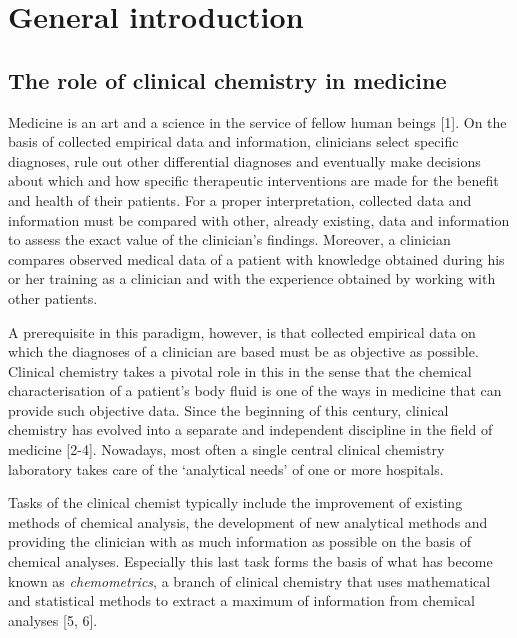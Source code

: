\documentclass[
  12pt,
  a4paperpaper,
]{report}
\author{}
\date{}
\begin{document}
\hypertarget{general-introduction}{%
\chapter{General introduction}\label{general-introduction}}

\hypertarget{the-role-of-clinical-chemistry-in-medicine}{%
\section{The role of clinical chemistry in
medicine}\label{the-role-of-clinical-chemistry-in-medicine}}

Medicine is an art and a science in the service of fellow human beings
{[}1{]}. On the basis of collected empirical data and information,
clinicians select specific diagnoses, rule out other differential
diagnoses and eventually make decisions about which and how specific
therapeutic interventions are made for the benefit and health of their
patients. For a proper interpretation, collected data and information
must be compared with other, already existing, data and information to
assess the exact value of the clinician's findings. Moreover, a
clinician compares observed medical data of a patient with knowledge
obtained during his or her training as a clinician and with the
experience obtained by working with other patients.

A prerequisite in this paradigm, however, is that collected empirical
data on which the diagnoses of a clinician are based must be as
objective as possible. Clinical chemistry takes a pivotal role in this
in the sense that the chemical characterisation of a patient's body
fluid is one of the ways in medicine that can provide such objective
data. Since the beginning of this century, clinical chemistry has
evolved into a separate and independent discipline in the field of
medicine {[}2-4{]}. Nowadays, most often a single central clinical
chemistry laboratory takes care of the `analytical needs' of one or more
hospitals.

Tasks of the clinical chemist typically include the improvement of
existing methods of chemical analysis, the development of new analytical
methods and providing the clinician with as much information as possible
on the basis of chemical analyses. Especially this last task forms the
basis of what has become known as \emph{chemometrics}, a branch of
clinical chemistry that uses mathematical and statistical methods to
extract a maximum of information from chemical analyses {[}5, 6{]}.
\end{document}
